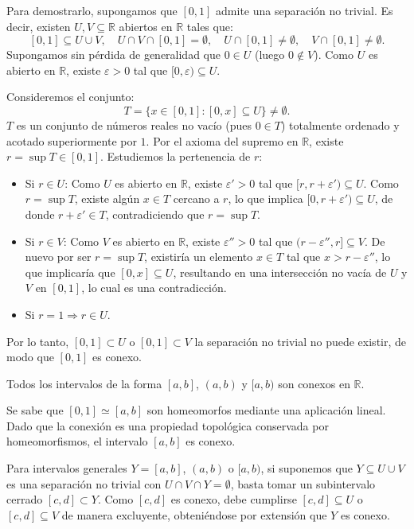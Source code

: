 \begin{dem}
Para demostrarlo, supongamos que $[0, 1]$ admite una separación no trivial. Es decir, existen $U, V \subseteq \mathbb{R}$ abiertos en $\mathbb{R}$ tales que:
\[
[0, 1] \subseteq U \cup V, \quad U \cap V \cap [0, 1] = \emptyset, \quad U \cap [0, 1] \neq \emptyset, \quad V \cap [0, 1] \neq \emptyset.
\]
Supongamos sin pérdida de generalidad que $0 \in U$ (luego $0 \notin V$). Como $U$ es abierto en $\mathbb{R}$, existe $\varepsilon > 0$ tal que $[0, \varepsilon) \subseteq U$.

Consideremos el conjunto:
\[
T = \{ x \in [0, 1] : [0, x] \subseteq U \} \neq \emptyset.
\]
$T$ es un conjunto de números reales no vacío (pues $0 \in T$) totalmente ordenado y acotado superiormente por $1$. Por el axioma del supremo en $\mathbb{R}$, existe $r = \sup T \in [0, 1]$. Estudiemos la pertenencia de $r$:

\begin{itemize}
    \item Si $r \in U$: Como $U$ es abierto en $\mathbb{R}$, existe $\varepsilon' > 0$ tal que $[r, r + \varepsilon') \subseteq U$. Como $r = \sup T$, existe algún $x \in T$ cercano a $r$, lo que implica $[0, r + \varepsilon') \subseteq U$, de donde $r + \varepsilon' \in T$, contradiciendo que $r = \sup T$.
    \item Si $r \in V$: Como $V$ es abierto en $\mathbb{R}$, existe $\varepsilon'' > 0$ tal que $(r - \varepsilon'', r] \subseteq V$. De nuevo por ser $r = \sup T$, existiría un elemento $x \in T$ tal que $x > r - \varepsilon''$, lo que implicaría que $[0, x] \subseteq U$, resultando en una intersección no vacía de $U$ y $V$ en $[0, 1]$, lo cual es una contradicción.
    \item Si $r=1\Rightarrow r\in U$.
\end{itemize}

Por lo tanto, $[0,1]\subset U$ o $[0,1] \subset V$ la separación no trivial no puede existir, de modo que $[0, 1]$ es conexo.
\end{dem}

\begin{prop}
Todos los intervalos de la forma $[a, b]$, $(a, b)$ y $[a, b)$ son conexos en $\mathbb{R}$.
\end{prop}

\begin{dem}
Se sabe que $[0, 1] \simeq [a, b]$ son homeomorfos mediante una aplicación lineal. Dado que la conexi\'on es una propiedad topológica conservada por homeomorfismos, el intervalo $[a, b]$ es conexo.

Para intervalos generales $Y = [a, b]$, $(a, b)$ o $[a, b)$, si suponemos que $Y \subseteq U \cup V$ es una separación no trivial con $U \cap V \cap Y = \emptyset$, basta tomar un subintervalo cerrado $[c, d] \subset Y$. Como $[c, d]$ es conexo, debe cumplirse $[c, d] \subseteq U$ o $[c, d] \subseteq V$ de manera excluyente, obteniéndose por extensión que $Y$ es conexo.
\end{dem}

